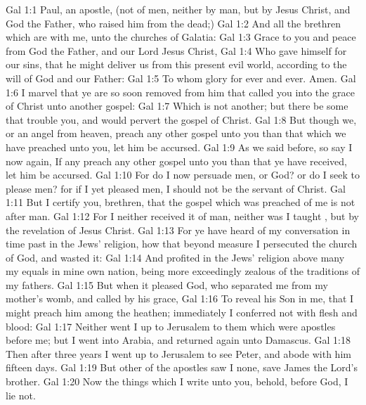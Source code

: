 \vs Gal 1:1 Paul, an apostle, (not of men, neither by man, but by Jesus Christ, and God the Father, who raised him from the dead;)
\vs Gal 1:2 And all the brethren which are with me, unto the churches of Galatia:
\vs Gal 1:3 Grace  to you and peace from God the Father, and  our Lord Jesus Christ,
\vs Gal 1:4 Who gave himself for our sins, that he might deliver us from this present evil world, according to the will of God and our Father:
\vs Gal 1:5 To whom  glory for ever and ever. Amen.
\vs Gal 1:6 I marvel that ye are so soon removed from him that called you into the grace of Christ unto another gospel:
\vs Gal 1:7 Which is not another; but there be some that trouble you, and would pervert the gospel of Christ.
\vs Gal 1:8 But though we, or an angel from heaven, preach any other gospel unto you than that which we have preached unto you, let him be accursed.
\vs Gal 1:9 As we said before, so say I now again, If any  preach any other gospel unto you than that ye have received, let him be accursed.
\vs Gal 1:10 For do I now persuade men, or God? or do I seek to please men? for if I yet pleased men, I should not be the servant of Christ.
\vs Gal 1:11 But I certify you, brethren, that the gospel which was preached of me is not after man.
\vs Gal 1:12 For I neither received it of man, neither was I taught , but by the revelation of Jesus Christ.
\vs Gal 1:13 For ye have heard of my conversation in time past in the Jews' religion, how that beyond measure I persecuted the church of God, and wasted it:
\vs Gal 1:14 And profited in the Jews' religion above many my equals in mine own nation, being more exceedingly zealous of the traditions of my fathers.
\vs Gal 1:15 But when it pleased God, who separated me from my mother's womb, and called  by his grace,
\vs Gal 1:16 To reveal his Son in me, that I might preach him among the heathen; immediately I conferred not with flesh and blood:
\vs Gal 1:17 Neither went I up to Jerusalem to them which were apostles before me; but I went into Arabia, and returned again unto Damascus.
\vs Gal 1:18 Then after three years I went up to Jerusalem to see Peter, and abode with him fifteen days.
\vs Gal 1:19 But other of the apostles saw I none, save James the Lord's brother.
\vs Gal 1:20 Now the things which I write unto you, behold, before God, I lie not.
